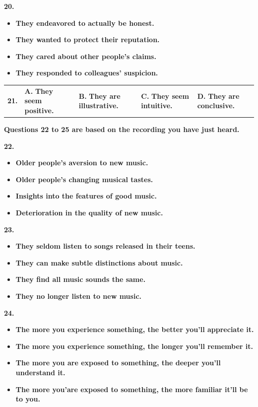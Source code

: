 \documentclass[UTF8,11pt]{ctexart}
\begin{document}
\textbf{20.}


\begin{itemize}[leftmargin=2em,itemsep=.2em,topsep=.4em]\item[A.] \textbf{They endeavored to actually be honest.}
\item[B.] \textbf{They wanted to protect their reputation.}
\item[C.] \textbf{They cared about other people's claims.}
\item[D.] \textbf{They responded to colleagues' suspicion.}
\end{itemize}

\noindent\begin{tabularx}{\linewidth}{@{}lXXXX@{}}\textbf{21.} & \textbf{A.} \textbf{They seem positive.} & \textbf{B.} \textbf{They are illustrative.} & \textbf{C.} \textbf{They seem intuitive.} & \textbf{D.} \textbf{They are conclusive.}\\\end{tabularx}\par

\textbf{Questions 22 to 25 are based on the recording you have just heard.}


\textbf{22.}


\begin{itemize}[leftmargin=2em,itemsep=.2em,topsep=.4em]\item[A.] \textbf{Older people's aversion to new music.}
\item[B.] \textbf{Older people's changing musical tastes.}
\item[C.] \textbf{Insights into the features of good music.}
\item[D.] \textbf{Deterioration in the quality of new music.}
\end{itemize}

\textbf{23.}


\begin{itemize}[leftmargin=2em,itemsep=.2em,topsep=.4em]\item[A.] \textbf{They seldom listen to songs released in their teens.}
\item[B.] \textbf{They can make subtle distinctions about music.}
\item[C.] \textbf{They find all music sounds the same.}
\item[D.] \textbf{They no longer listen to new music.}
\end{itemize}

\textbf{24.}


\begin{itemize}[leftmargin=2em,itemsep=.2em,topsep=.4em]\item[A.] \textbf{The more you experience something, the better you'll appreciate it.}
\item[B.] \textbf{The more you experience something, the longer you'll remember it.}
\item[C.] \textbf{The more you are exposed to something, the deeper you'll understand it.}
\item[D.] \textbf{The more you'are exposed to something, the more familiar it'll be to you.}
\end{itemize}
\end{document}
